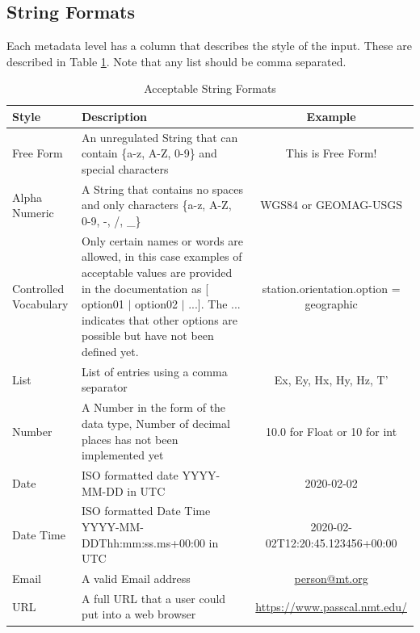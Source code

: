 \documentclass[12pt]{article}
\begin{document}
\subsection{String Formats}

Each metadata level has a column that describes the style of the input.  These are described in Table \ref{tab:values}.  Note that any list should be comma separated.

\begin{table}[htb!]
	\centering
	\caption[Acceptable String Formats]{Acceptable String Formats}
	\begin{tabular}{>{\raggedright}p{.9in}>{\raggedright}p{3.1in}c}
		\toprule
		\textbf{Style} & \textbf{Description}  & \textbf{Example} \\ \midrule
		Free Form & An unregulated String that can contain \{a-z, A-Z, 0-9\} and special characters & This is Free Form! \\ \midrule
		
		Alpha Numeric & A String that contains no spaces and only characters \{a-z, A-Z, 0-9, -, /, \_\} & WGS84 or GEOMAG-USGS \\ \midrule
		Controlled Vocabulary & Only certain names or words are allowed, in this case examples of acceptable values are provided in the documentation as [ option01 $|$ option02 $|$ ...]. The ... indicates that other options are possible but have not been defined yet. &  station.orientation.option = geographic \\ \midrule
		List & List of entries using a comma separator & Ex, Ey, Hx, Hy, Hz, T' \\ \midrule
		Number & A Number in the form of the data type, Number of decimal places has not been implemented yet & 10.0 for Float or 10 for int \\ \midrule
		Date & ISO formatted date YYYY-MM-DD in UTC & 2020-02-02 \\ \midrule
		Date Time & ISO formatted Date Time YYYY-MM-DDThh:mm:ss.ms+00:00 in UTC & 2020-02-02T12:20:45.123456+00:00 \\ \midrule
		Email & A valid Email address & \url{person@mt.org} \\ \midrule
		URL & A full URL that a user could put into a web browser  &  \url{https://www.passcal.nmt.edu/} \\ \bottomrule
		
		
	\end{tabular}
	\label{tab:values}
\end{table}
\end{document}
